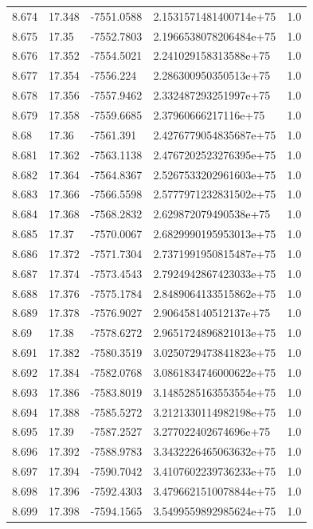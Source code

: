 \begin{tabular}{lllll}
8.674 & 17.348 & -7551.0588 & 2.1531571481400714e+75 & 1.0 \\
8.675 & 17.35 & -7552.7803 & 2.1966538078206484e+75 & 1.0 \\
8.676 & 17.352 & -7554.5021 & 2.241029158313588e+75 & 1.0 \\
8.677 & 17.354 & -7556.224 & 2.286300950350513e+75 & 1.0 \\
8.678 & 17.356 & -7557.9462 & 2.332487293251997e+75 & 1.0 \\
8.679 & 17.358 & -7559.6685 & 2.37960666217116e+75 & 1.0 \\
8.68 & 17.36 & -7561.391 & 2.4276779054835687e+75 & 1.0 \\
8.681 & 17.362 & -7563.1138 & 2.4767202523276395e+75 & 1.0 \\
8.682 & 17.364 & -7564.8367 & 2.5267533202961603e+75 & 1.0 \\
8.683 & 17.366 & -7566.5598 & 2.5777971232831502e+75 & 1.0 \\
8.684 & 17.368 & -7568.2832 & 2.629872079490538e+75 & 1.0 \\
8.685 & 17.37 & -7570.0067 & 2.6829990195953013e+75 & 1.0 \\
8.686 & 17.372 & -7571.7304 & 2.7371991950815487e+75 & 1.0 \\
8.687 & 17.374 & -7573.4543 & 2.7924942867423033e+75 & 1.0 \\
8.688 & 17.376 & -7575.1784 & 2.8489064133515862e+75 & 1.0 \\
8.689 & 17.378 & -7576.9027 & 2.906458140512137e+75 & 1.0 \\
8.69 & 17.38 & -7578.6272 & 2.9651724896821013e+75 & 1.0 \\
8.691 & 17.382 & -7580.3519 & 3.0250729473841823e+75 & 1.0 \\
8.692 & 17.384 & -7582.0768 & 3.0861834746000622e+75 & 1.0 \\
8.693 & 17.386 & -7583.8019 & 3.1485285163553554e+75 & 1.0 \\
8.694 & 17.388 & -7585.5272 & 3.2121330114982198e+75 & 1.0 \\
8.695 & 17.39 & -7587.2527 & 3.277022402674696e+75 & 1.0 \\
8.696 & 17.392 & -7588.9783 & 3.3432226465063632e+75 & 1.0 \\
8.697 & 17.394 & -7590.7042 & 3.4107602239736233e+75 & 1.0 \\
8.698 & 17.396 & -7592.4303 & 3.4796621510078844e+75 & 1.0 \\
8.699 & 17.398 & -7594.1565 & 3.5499559892985624e+75 & 1.0 \\

\end{tabular}
